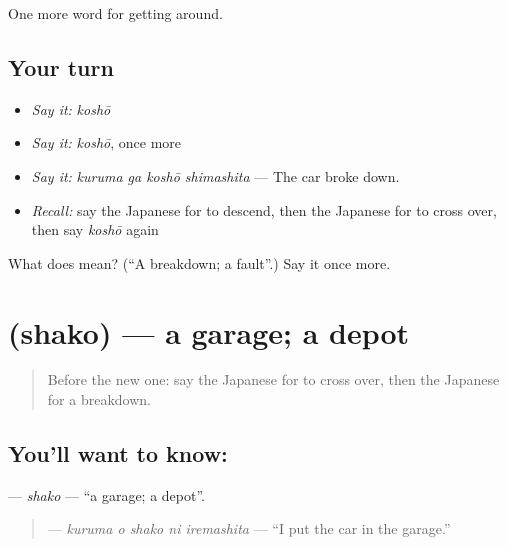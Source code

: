 \begin{grammarlens}[title={What you've built}]
One more word for getting around.
\end{grammarlens}

\subsection*{Your turn}
\begin{itemize}
\raggedright
  \item \emph{Say it:} \emph{koshō}
  \item \emph{Say it:} \emph{koshō}, once more
  \item \emph{Say it:} \emph{kuruma ga koshō shimashita} — The car broke down.
  \item \emph{Recall:} say the Japanese for to descend, then the Japanese for to cross over, then say \emph{koshō} again
\end{itemize}

\begin{tcolorbox}[breakable,colback=teal!4,colframe=teal!35!black,title={Before you move on}]
What does  mean? (\textquotedblleft{}A breakdown; a fault\textquotedblright{}.) Say it once more.
\end{tcolorbox}
\section[\texorpdfstring{\ja{しゃこ} (shako)}{しゃこ (shako)}]{ (shako) — a garage; a depot}

\label{lesson:JA-C395-shako}



\begin{quote}
Before the new one: say the Japanese for to cross over, then the Japanese for a breakdown.
\end{quote}

\subsection*{You'll want to know: }
\textbf{} — \emph{shako} — \textquotedblleft{}a garage; a depot\textquotedblright{}.

\begin{quote}
\textbf{  } — \emph{kuruma o shako ni iremashita} — \textquotedblleft{}I put the car in the garage.\textquotedblright{}
\end{quote}

